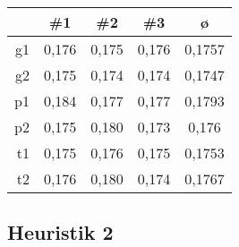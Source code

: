        \begin{center}
            \begin{tabular}{|r|S[table-format=1.3]|S[table-format=1.3]|S[table-format=1.3]|S[table-format=1.4]|}
                \hline
                 & {\#1} & {\#2} & {\#3} & ø \\\hline
                g1 & 0,176 & 0,175 & 0,176 & 0,1757 \\\hline
                g2 & 0,175 & 0,174 & 0,174 & 0,1747 \\\hline
                p1 & 0,184 & 0,177 & 0,177 & 0,1793 \\\hline
                p2 & 0,175 & 0,180 & 0,173 & 0,176  \\\hline
                t1 & 0,175 & 0,176 & 0,175 & 0,1753 \\\hline
                t2 & 0,176 & 0,180 & 0,174 & 0,1767 \\\hline
            \end{tabular}
        \end{center}

\subsection{Heuristik 2} \label{app:heuristik2_laufzeit}

